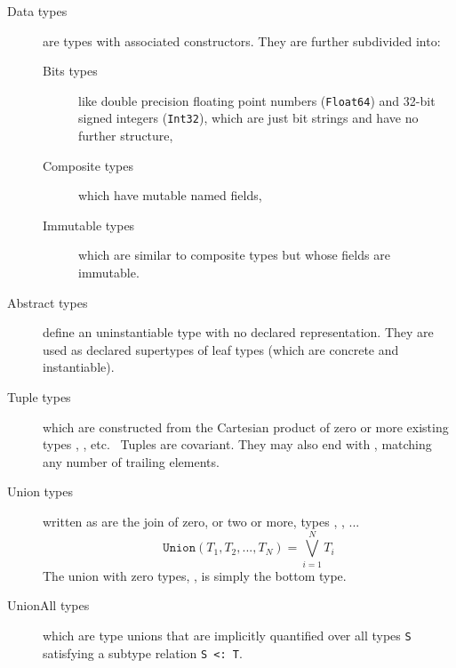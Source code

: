 \documentclass[10pt, preprint]{sigplanconf}
\begin{document}
\begin{description}

\item[Data types] are types with associated constructors. They
	are further subdivided into:
	\begin{description}
	
	\item[Bits types] like double precision floating point numbers
	(\verb|Float64|) and 32-bit signed integers (\verb|Int32|), which
        are just bit strings and have no further structure,

	\item[Composite types] which have mutable named fields,

	\item[Immutable types] which are similar to composite types but
          whose fields are immutable.

	\end{description}

\item[Abstract types] define an uninstantiable type with no declared
	representation. They are used as declared supertypes of leaf types
	(which are concrete and instantiable).

\item[Tuple types]  which are constructed from the Cartesian
	product of zero or more existing types , ,
	etc.~\cite[Sec. 11.7]{Pierce2002} Tuples are covariant. They may also
        end with , matching any number of trailing elements.

\item[Union types] written as  are the join of zero,
	or two or more, types , , ...~\cite[Sec.
	15.7]{Pierce2002}
	\begin{equation}
		\texttt{Union}(T_1, T_2, ..., T_N) = \bigvee_{i=1}^N T_i 
	\end{equation}
	The union with zero types, , is simply the bottom type.


\item[UnionAll types] which are type unions that are implicitly quantified over
	all types \verb|S| satisfying a subtype relation \verb|S <: T|.

\end{description}
\end{document}
